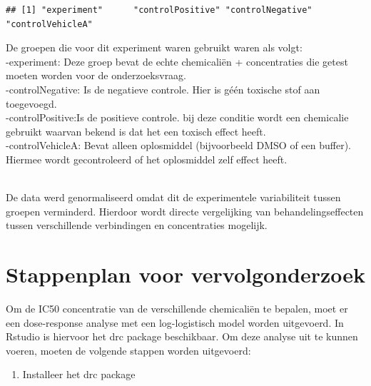 \documentclass[
]{book}
\newenvironment{Shaded}{\begin{snugshade}}{\end{snugshade}}
\newcommand{\CommentTok}[1]{\textcolor[rgb]{0.56,0.35,0.01}{\textit{#1}}}
\newcommand{\FunctionTok}[1]{\textcolor[rgb]{0.13,0.29,0.53}{\textbf{#1}}}
\newcommand{\NormalTok}[1]{#1}
\newcommand{\SpecialCharTok}[1]{\textcolor[rgb]{0.81,0.36,0.00}{\textbf{#1}}}
\providecommand{\tightlist}{%
  \setlength{\itemsep}{0pt}\setlength{\parskip}{0pt}}
\begin{document}
\begin{Shaded}
\end{Shaded}

\begin{verbatim}
## [1] "experiment"      "controlPositive" "controlNegative" "controlVehicleA"
\end{verbatim}

De groepen die voor dit experiment waren gebruikt waren als volgt:\\
-experiment: Deze groep bevat de echte chemicaliën + concentraties die getest moeten worden voor de onderzoeksvraag.\\
-controlNegative: Is de negatieve controle. Hier is géén toxische stof aan toegevoegd.\\
-controlPositive:Is de positieve controle. bij deze conditie wordt een chemicalie gebruikt waarvan bekend is dat het een toxisch effect heeft.\\
-controlVehicleA: Bevat alleen oplosmiddel (bijvoorbeeld DMSO of een buffer). Hiermee wordt gecontroleerd of het oplosmiddel zelf effect heeft.\\
\strut \\
De data werd genormaliseerd omdat dit de experimentele variabiliteit tussen groepen verminderd. Hierdoor wordt directe vergelijking van behandelingseffecten tussen verschillende verbindingen en concentraties mogelijk.

\section{Stappenplan voor vervolgonderzoek}\label{stappenplan-voor-vervolgonderzoek}

Om de IC50 concentratie van de verschillende chemicaliën te bepalen, moet er een dose-response analyse met een log-logistisch model worden uitgevoerd. In Rstudio is hiervoor het drc package beschikbaar. Om deze analyse uit te kunnen voeren, moeten de volgende stappen worden uitgevoerd:\\

\begin{enumerate}
\def\labelenumi{\arabic{enumi}.}
\tightlist
\item
  Installeer het drc package
\end{enumerate}
\end{document}
